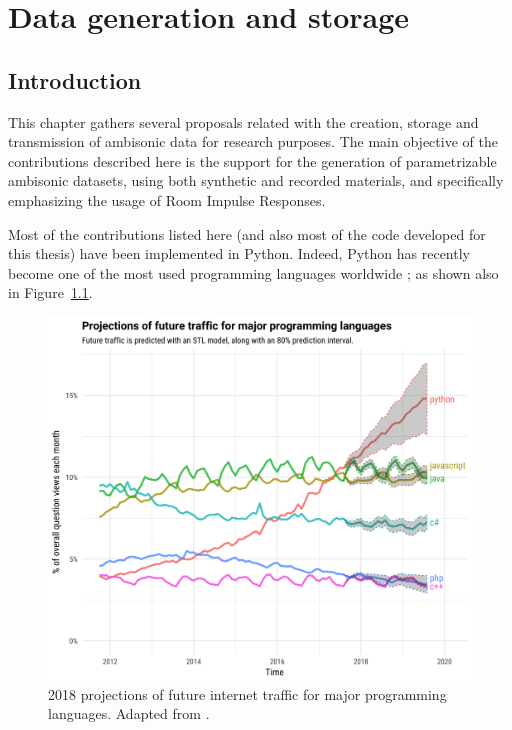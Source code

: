 \chapter{Data generation and storage}
\label{chap:data}

\section{Introduction}
\label{sec:intro_data}

This chapter gathers several proposals related with the creation, storage and transmission of ambisonic data for research purposes. The main objective of the contributions described here is the support for the generation of parametrizable ambisonic datasets, using both synthetic and recorded materials, and specifically emphasizing the usage of Room Impulse Responses.

Most of the contributions listed here (and also most of the code developed for this thesis) have been implemented in Python. Indeed, Python has recently become one of the most used programming languages worldwide \cite{theoverflow, PYPL, TIOBE}; as shown also in Figure~\ref{fig:popularity}.

\begin{figure}
  \centering
    \includegraphics[width=\textwidth]{Figures/DataGeneration/projections-1-1400x1200.png}
    \caption{2018 projections of future internet traffic for major programming languages. Adapted from \cite{theoverflow}.}
    \label{fig:popularity}
\end{figure}


